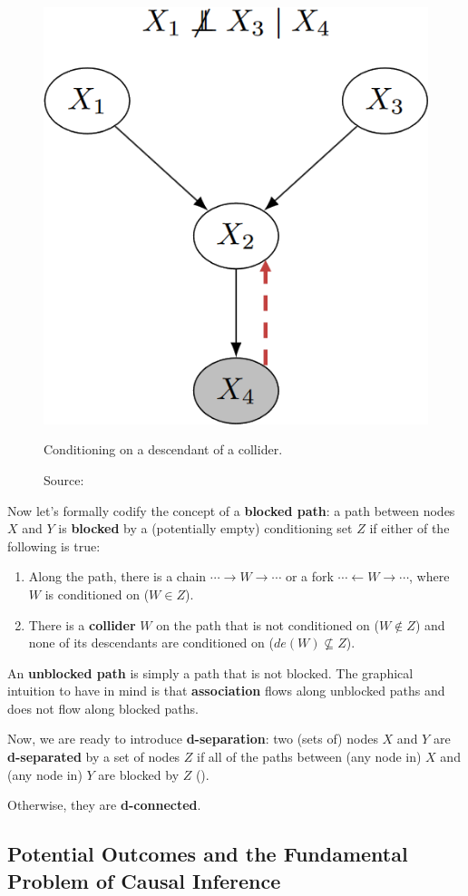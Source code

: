 \begin{figure}[h]
    \centering
    \includegraphics[width=.25\linewidth]{figures/ch3/20.descendant.png}
    \caption{Conditioning on a descendant of a collider.}
    \vspace{-10px}
    \caption*{\scriptsize{Source: \cite{Neal_2020a}}}
    \label{fig:descendants}
\end{figure}

Now let's formally codify the concept of a \textbf{blocked path}:
a path between nodes \( X \) and \( Y \) is \textbf{blocked} by a
(potentially empty) conditioning set \( Z \) if either of the following
is true:
\begin{enumerate}
    \item Along the path, there is a chain
    \(\cdots \rightarrow W \rightarrow \cdots\) or a fork
    \(\cdots \leftarrow W \rightarrow \cdots\),
    where \( W \) is conditioned on (\( W \in Z \)).
    \item There is a \textbf{collider} \( W \) on the path
    that is not conditioned on (\( W \notin Z \)) and none
    of its descendants are conditioned on (\( de(W) \nsubseteq Z \)).
\end{enumerate}

An \textbf{unblocked path} is simply a path that is not blocked.
The graphical intuition to have in mind is that \textbf{association} flows along
unblocked paths and does not flow along blocked paths.

Now, we are ready to introduce
\textbf{d-separation}: two (sets of) nodes \( X \) and \( Y \) are
\textbf{d-separated} by a set of nodes \( Z \) if all of the paths
between (any node in) \( X \) and (any node in) \( Y \) are blocked by \( Z \)
(\cite{pearl1988}).

Otherwise, they are \textbf{d-connected}.


\subsection{Potential Outcomes and the Fundamental Problem of Causal Inference}
\label{sec:potential_outcomes}

